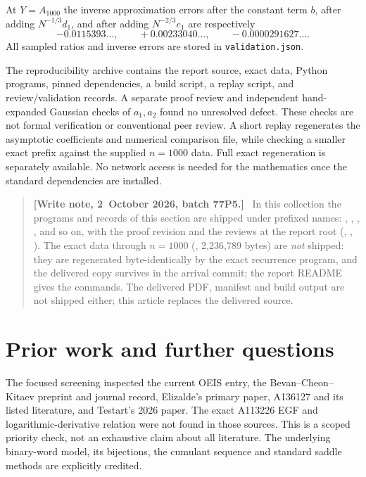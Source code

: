 \documentclass[11pt]{article}
\theoremstyle{remark}\newtheorem{remark}[theorem]{Remark}
\newenvironment{writenote}{\begin{quote}\small\raggedright\textbf{[Write note, 2~October 2026, batch 77P5.]}\ }{\end{quote}}
\begin{document}
At $Y=A_{1000}$ the inverse approximation errors after the constant
term $b$, after adding $N^{-1/3}d_1$, and after adding
$N^{-2/3}e_1$ are respectively
\[
 -0.0115393\ldots,\qquad +0.00233040\ldots,\qquad
 -0.0000291627\ldots.
\]
All sampled ratios and inverse errors are stored in
\texttt{validation.json}.

The reproducibility archive contains the report source, exact data,
Python programs, pinned dependencies, a build script, a replay
script, and review/validation records. A separate proof review and
independent hand-expanded Gaussian checks of $a_1,a_2$ found no
unresolved defect. These checks are not formal verification or
conventional peer review. A short replay regenerates the
asymptotic coefficients and numerical comparison file, while checking
a smaller exact prefix against the supplied $n=1000$ data. Full exact
regeneration is separately available. No network access is needed for
the mathematics once the standard dependencies are installed.
\begin{writenote}
In this collection the programs and records of this section are shipped
under prefixed names: ,
,
,
,
 and so on, with the proof
revision and the reviews at the report root
(,
,
). The exact data through
$n=1000$ (, 2{,}236{,}789 bytes) are
\emph{not} shipped: they are regenerated byte-identically by the exact
recurrence program, and the delivered copy survives in the arrival
commit; the report README gives the commands. The delivered PDF, manifest
and build output are not shipped either; this article replaces the
delivered source.
\end{writenote}

\section{Prior work and further questions}\label{vav:sec:prior}

The focused screening inspected the current OEIS entry, the
Bevan--Cheon--Kitaev preprint and journal record, Elizalde's primary
paper, A136127 and its listed literature, and Testart's 2026 paper.
The exact A113226 EGF and logarithmic-derivative relation were not
found in those sources. This is a scoped priority check, not an
exhaustive claim about all literature. The underlying binary-word
model, its bijections, the cumulant sequence and standard saddle
methods are explicitly credited.
\end{document}
